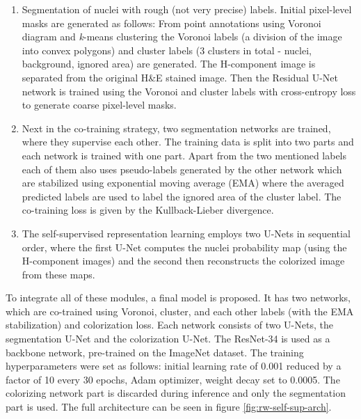 \begin{enumerate}
    \item Segmentation of nuclei with rough (not very precise) labels. Initial pixel-level masks are generated as follows: From point annotations using Voronoi diagram and \textit{k}-means clustering the Voronoi labels (a division of the image into convex polygons) and cluster labels (3 clusters in total - nuclei, background, ignored area) are generated. The H-component image is separated from the original H\&E stained image. Then the Residual U-Net network is trained using the Voronoi and cluster labels with cross-entropy loss to generate coarse pixel-level masks.
    \item Next in the co-training strategy, two segmentation networks are trained, where they supervise each other. The training data is split into two parts and each network is trained with one part. Apart from the two mentioned labels each of them also uses pseudo-labels generated by the other network which are stabilized using exponential moving average (EMA) where the averaged predicted labels are used to label the ignored area of the cluster label. The co-training loss is given by the Kullback-Lieber divergence.
    \item The self-supervised representation learning employs two U-Nets in sequential order, where the first U-Net computes the nuclei probability map (using the H-component images) and the second then reconstructs the colorized image from these maps.
\end{enumerate}

To integrate all of these modules, a final model is proposed. It has two networks, which are co-trained using Voronoi, cluster, and each other labels (with the EMA stabilization) and colorization loss. Each network consists of two U-Nets, the segmentation U-Net and the colorization U-Net. The ResNet-34 is used as a backbone network, pre-trained on the ImageNet dataset. The training hyperparameters were set as follows: initial learning rate of 0.001 reduced by a factor of 10 every 30 epochs, Adam optimizer, weight decay set to 0.0005. The colorizing network part is discarded during inference and only the segmentation part is used. The full architecture can be seen in figure \ref{fig:rw-self-sup-arch}.

